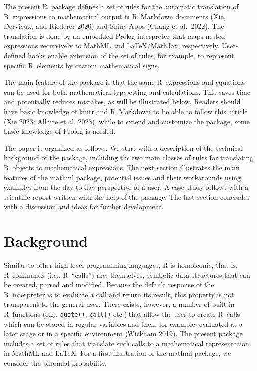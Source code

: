 The present R~package defines a set of rules for the automatic
translation of R~expressions to mathematical output in R~Markdown
documents (Xie, Dervieux, and Riederer 2020) and Shiny Apps (Chang et
al.~2022). The translation is done by an embedded Prolog interpreter
that maps nested expressions recursively to MathML and LaTeX/MathJax,
respectively. User-defined hooks enable extension of the set of rules,
for example, to represent specific R~elements by custom mathematical
signs.

The main feature of the package is that the same R~expressions and
equations can be used for both mathematical typesetting and
calculations. This saves time and potentially reduces mistakes, as will
be illustrated below. Readers should have basic knowledge of knitr and
R~Markdown to be able to follow this article (Xie 2023; Allaire et al.
2023), while to extend and customize the package, some basic knowledge
of Prolog is needed.

The paper is organized as follows. We start with a description of the
technical background of the package, including the two main classes of
rules for translating R~objects to mathematical expressions. The next
section illustrates the main features of the
\href{https://CRAN.R-project.org/package=mathml}{mathml} package, potential
issues and their workarounds using examples from the day-to-day
perspective of a user. A case study follows with a scientific report
written with the help of the package. The last section concludes with a
discussion and ideas for further development.

\hypertarget{background}{%
\section{Background}\label{background}}

Similar to other high-level programming languages, R is homoiconic, that
is, R~commands (i.e., R~``calls'') are, themselves, symbolic data
structures that can be created, parsed and modified. Because the default
response of the R~interpreter is to evaluate a call and return its
result, this property is not transparent to the general user. There
exists, however, a number of built-in R~functions (e.g., \texttt{quote()},
\texttt{call()} etc.) that allow the user to create R~calls which can be stored
in regular variables and then, for example, evaluated at a later stage
or in a specific environment (Wickham 2019). The present package
includes a set of rules that translate such calls to a mathematical
representation in MathML and LaTeX. For a first illustration of the
mathml package, we consider the binomial probability.

